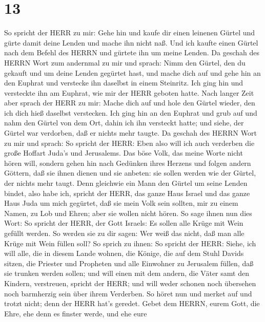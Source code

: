 \hypertarget{section-12}{%
\section{13}\label{section-12}}

 So spricht der HERR zu mir: Gehe hin und kaufe dir einen
leinenen Gürtel und gürte damit deine Lenden und mache ihn nicht naß.
 Und ich kaufte einen Gürtel nach dem Befehl des HERRN und
gürtete ihn um meine Lenden.  Da geschah des HERRN Wort zum
andernmal zu mir und sprach:  Nimm den Gürtel, den du
gekauft und um deine Lenden gegürtet hast, und mache dich auf und gehe
hin an den Euphrat und verstecke ihn daselbst in einem Steinritz.
 Ich ging hin und versteckte ihn am Euphrat, wie mir der
HERR geboten hatte.  Nach langer Zeit aber sprach der HERR
zu mir: Mache dich auf und hole den Gürtel wieder, den ich dich hieß
daselbst verstecken.  Ich ging hin an den Euphrat und grub
auf und nahm den Gürtel von dem Ort, dahin ich ihn versteckt hatte; und
siehe, der Gürtel war verdorben, daß er nichts mehr taugte. 
Da geschah des HERRN Wort zu mir und sprach:  So spricht der
HERR: Eben also will ich auch verderben die große Hoffart Juda's und
Jerusalems.  Das böse Volk, das meine Worte nicht hören
will, sondern gehen hin nach Gedünken ihres Herzens und folgen andern
Göttern, daß sie ihnen dienen und sie anbeten: sie sollen werden wie der
Gürtel, der nichts mehr taugt.  Denn gleichwie ein Mann den
Gürtel um seine Lenden bindet, also habe ich, spricht der HERR, das
ganze Haus Israel und das ganze Haus Juda um mich gegürtet, daß sie mein
Volk sein sollten, mir zu einem Namen, zu Lob und Ehren; aber sie wollen
nicht hören.  So sage ihnen nun dies Wort: So spricht der
HERR, der Gott Israels: Es sollen alle Krüge mit Wein gefüllt werden. So
werden sie zu dir sagen: Wer weiß das nicht, daß man alle Krüge mit Wein
füllen soll?  So sprich zu ihnen: So spricht der HERR:
Siehe, ich will alle, die in diesem Lande wohnen, die Könige, die auf
dem Stuhl Davids sitzen, die Priester und Propheten und alle Einwohner
zu Jerusalem füllen, daß sie trunken werden sollen;  und
will einen mit dem andern, die Väter samt den Kindern, verstreuen,
spricht der HERR; und will weder schonen noch übersehen noch barmherzig
sein über ihrem Verderben.  So höret nun und merket auf und
trotzt nicht; denn der HERR hat's geredet.  Gebet dem
HERRN, eurem Gott, die Ehre, ehe denn es finster werde, und ehe eure
